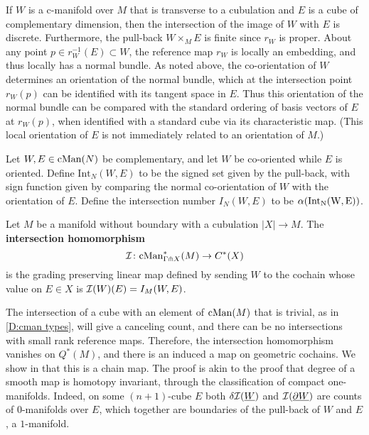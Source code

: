 If $W$ is a c-manifold over $M$ that is transverse to a cubulation and $E$ is a cube of complementary dimension, then the intersection of the image of $W$ with $E$ is discrete.
Furthermore, the pull-back $W \times_M E$ is finite since $r_W$ is proper.
About any point $p \in r_W^{-1}(E) \subset W$, the reference map $r_W$ is locally an embedding, and thus locally has a normal bundle.
As noted above, the co-orientation of $W$ determines an orientation of the normal bundle, which at the intersection point $r_W(p)$ can be identified with its tangent space in $E$.
Thus this orientation of the normal bundle can be compared with the standard ordering of basis vectors of $E$ at $r_W(p)$, when identified with a standard cube via its characteristic map.
(This local orientation of $E$ is not immediately related to an orientation of $M$.)

\begin{definition}\label{D:intersection number}
	Let $W, E \in \mathrm{cMan}({N})$ be complementary, and let $W$ be co-oriented while $E$ is oriented. Define $\mathrm{Int}_N(W, E)$ to be the signed set given
	by the pull-back, with sign function given by comparing the normal co-orientation of $W$ with the orientation of $E$.
	Define the intersection number $I_N(W,E)$ to be $\alpha(\rm{Int}_N(W, E))$.
\end{definition}

\begin{definition}\label{D:intersection homomorphism}
	Let $M$ be a manifold without boundary with a cubulation $|X| \to M$.
	The \textbf{intersection homomorphism}
	\begin{equation*}
		\mathcal{I} \colon \mathrm{cMan}^*_{\Gamma \pitchfork X}(M) \to C^{\ast}(X)
	\end{equation*}
	is the grading preserving linear map defined by sending $W$ to the cochain whose value on $E \in X$ is $\mathcal{I}(W)(E) = I_M(W, E)$.
\end{definition}

The intersection of a cube with an element of $\mathrm{cMan}(M)$ that is trivial, as in \cref{D:cman types}, will give a canceling count, and there can be no intersections with small rank reference maps.
Therefore, the intersection homomorphism vanishes on $Q^*(M)$, and there is an induced a map on geometric cochains.
We show in \cite{medina2022foundations} that this is a chain map.
The proof is akin to the proof that degree of a smooth map is homotopy invariant, through the classification of compact one-manifolds.
Indeed, on some $(n+1)$-cube $E$ both $\delta \mathcal{I}(\underline{W})$ and $\mathcal{I}(\underline{\partial W})$ are counts of $0$-manifolds over $E$, which together are boundaries of the pull-back of $W$ and $E$, a $1$-manifold.

